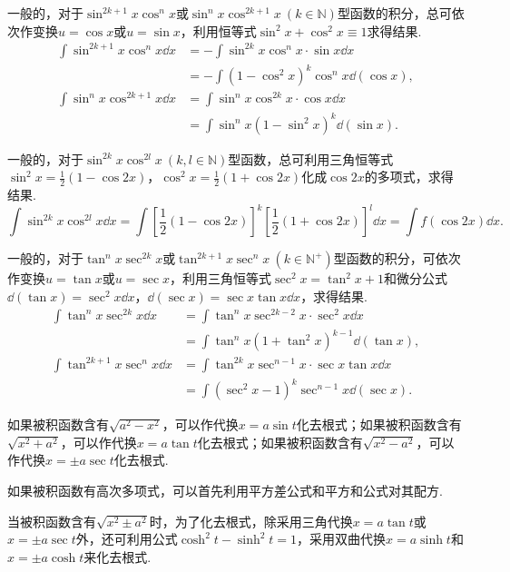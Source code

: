 \begin{example}
一般的，对于\(\sin^{2k+1} x \cos^n x\)或\(\sin^n x \cos^{2k+1} x\ (k \in \mathbb{N})\)型函数的积分，总可依次作变换\(u=\cos x\)或\(u=\sin x\)，利用恒等式\(\sin^2 x + \cos^2 x \equiv 1\)求得结果.
\begin{align*}
\int \sin^{2k+1} x \cos^n x \dd{x}
&= - \int \sin^{2k} x \cos^n x \cdot \sin x \dd{x} \\
&= - \int (1-\cos^2 x)^k \cos^n x \dd(\cos x), \\
\int \sin^n x \cos^{2k+1} x \dd{x}
&= \int \sin^n x \cos^{2k} x \cdot \cos x \dd{x} \\
&= \int \sin^n x (1-\sin^2 x)^k \dd(\sin x).
\end{align*}
\end{example}

\begin{example}
一般的，对于\(\sin^{2k} x \cos^{2l} x\ (k,l \in \mathbb{N})\)型函数，总可利用三角恒等式\(\sin^2 x = \frac{1}{2}(1-\cos 2x)\)，\(\cos^2 x = \frac{1}{2}(1+\cos 2x)\)化成\(\cos 2x\)的多项式，求得结果.\[
\int \sin^{2k} x \cos^{2l} x \dd{x}
= \int \left[\frac{1}{2}(1-\cos 2x)\right]^k \left[\frac{1}{2}(1+\cos 2x)\right]^l \dd{x}
= \int f(\cos 2x) \dd{x}.
\]
\end{example}

\begin{example}
一般的，对于\(\tan^n x \sec^{2k} x\)或\(\tan^{2k+1} x \sec^n x\ (k \in \mathbb{N}^+)\)型函数的积分，可依次作变换\(u=\tan x\)或\(u=\sec x\)，利用三角恒等式\(\sec^2 x = \tan^2 x + 1\)和微分公式\(\dd(\tan x) = \sec^2 x \dd{x}\)，\(\dd(\sec x) = \sec x \tan x \dd{x}\)，求得结果.
\begin{align*}
\int \tan^n x \sec^{2k} x \dd{x}
&=\int \tan^n x\sec^{2k-2} x \cdot \sec^2 x \dd{x} \\
&=\int \tan^n x(1+\tan^2 x)^{k-1} \dd(\tan x), \\
\int \tan^{2k+1} x \sec^n x \dd{x}
&=\int \tan^{2k} x \sec^{n-1} x \cdot \sec x\tan x\dd{x} \\
&=\int (\sec^2 x - 1)^k \sec^{n-1} x \dd(\sec x).
\end{align*}
\end{example}

\begin{example}
如果被积函数含有\(\sqrt{a^2 - x^2}\)，可以作代换\(x = a \sin t\)化去根式；如果被积函数含有\(\sqrt{x^2 + a^2}\)，可以作代换\(x=a \tan t\)化去根式；如果被积函数含有\(\sqrt{x^2 - a^2}\)，可以作代换\(x=\pm a \sec t\)化去根式.

如果被积函数有高次多项式，可以首先利用平方差公式和平方和公式对其配方.

当被积函数含有\(\sqrt{x^2 \pm a^2}\)时，为了化去根式，除采用三角代换\(x = a \tan t\)或\(x = \pm a \sec t\)外，还可利用公式\(\cosh^2 t - \sinh^2 t = 1\)，采用双曲代换\(x = a \sinh t\)和\(x = \pm a \cosh t\)来化去根式.
\end{example}

